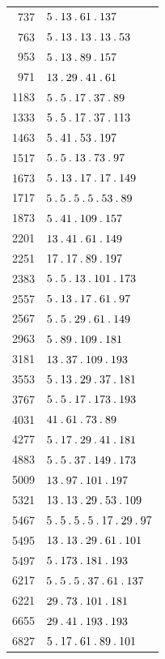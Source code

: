 \begin{longtable}{@{}r|l@{}}
737 & $5\mathbin{.} 13\mathbin{.} 61\mathbin{.} 137$\\
763 & $5\mathbin{.} 13\mathbin{.} 13\mathbin{.} 13\mathbin{.} 53$\\
953 & $5\mathbin{.} 13\mathbin{.} 89\mathbin{.} 157$\\
971 & $13\mathbin{.} 29\mathbin{.} 41\mathbin{.} 61$\\
1183 & $5\mathbin{.} 5\mathbin{.} 17\mathbin{.} 37\mathbin{.} 89$\\
1333 & $5\mathbin{.} 5\mathbin{.} 17\mathbin{.} 37\mathbin{.} 113$\\
1463 & $5\mathbin{.} 41\mathbin{.} 53\mathbin{.} 197$\\
1517 & $5\mathbin{.} 5\mathbin{.} 13\mathbin{.} 73\mathbin{.} 97$\\
1673 & $5\mathbin{.} 13\mathbin{.} 17\mathbin{.} 17\mathbin{.} 149$\\
1717 & $5\mathbin{.} 5\mathbin{.} 5\mathbin{.} 5\mathbin{.} 53\mathbin{.} 89$\\
1873 & $5\mathbin{.} 41\mathbin{.} 109\mathbin{.} 157$\\
2201 & $13\mathbin{.} 41\mathbin{.} 61\mathbin{.} 149$\\
2251 & $17\mathbin{.} 17\mathbin{.} 89\mathbin{.} 197$\\
2383 & $5\mathbin{.} 5\mathbin{.} 13\mathbin{.} 101\mathbin{.} 173$\\
2557 & $5\mathbin{.} 13\mathbin{.} 17\mathbin{.} 61\mathbin{.} 97$\\
2567 & $5\mathbin{.} 5\mathbin{.} 29\mathbin{.} 61\mathbin{.} 149$\\
2963 & $5\mathbin{.} 89\mathbin{.} 109\mathbin{.} 181$\\
3181 & $13\mathbin{.} 37\mathbin{.} 109\mathbin{.} 193$\\
3553 & $5\mathbin{.} 13\mathbin{.} 29\mathbin{.} 37\mathbin{.} 181$\\
3767 & $5\mathbin{.} 5\mathbin{.} 17\mathbin{.} 173\mathbin{.} 193$\\
4031 & $41\mathbin{.} 61\mathbin{.} 73\mathbin{.} 89$\\
4277 & $5\mathbin{.} 17\mathbin{.} 29\mathbin{.} 41\mathbin{.} 181$\\
4883 & $5\mathbin{.} 5\mathbin{.} 37\mathbin{.} 149\mathbin{.} 173$\\
5009 & $13\mathbin{.} 97\mathbin{.} 101\mathbin{.} 197$\\
5321 & $13\mathbin{.} 13\mathbin{.} 29\mathbin{.} 53\mathbin{.} 109$\\
5467 & $5\mathbin{.} 5\mathbin{.} 5\mathbin{.} 5\mathbin{.} 17\mathbin{.} 29\mathbin{.} 97$\\
5495 & $13\mathbin{.} 13\mathbin{.} 29\mathbin{.} 61\mathbin{.} 101$\\
5497 & $5\mathbin{.} 173\mathbin{.} 181\mathbin{.} 193$\\
6217 & $5\mathbin{.} 5\mathbin{.} 5\mathbin{.} 37\mathbin{.} 61\mathbin{.} 137$\\
6221 & $29\mathbin{.} 73\mathbin{.} 101\mathbin{.} 181$\\
6655 & $29\mathbin{.} 41\mathbin{.} 193\mathbin{.} 193$\\
6827 & $5\mathbin{.} 17\mathbin{.} 61\mathbin{.} 89\mathbin{.} 101$\\

\end{longtable}
